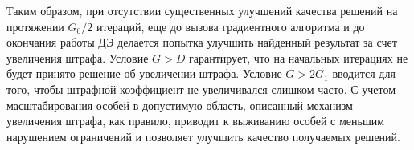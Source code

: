 Таким образом, при отсутствии существенных улучшений качества решений на протяжении $G_0/2$ итераций, еще до
вызова градиентного алгоритма и до окончания работы ДЭ делается попытка улучшить найденный результат за счет увеличения штрафа.
Условие $G > D$ гарантирует, что на начальных итерациях не будет принято решение об увеличении штрафа.
Условие $G > 2 G_1$ вводится для того, чтобы штрафной коэффициент не увеличивался слишком часто.
С учетом масштабирования особей в допустимую область, описанный механизм увеличения штрафа, как правило,
приводит к выживанию особей с меньшим нарушением ограничений и позволяет улучшить качество получаемых решений.

